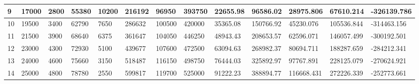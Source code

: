 \begin{table}[]
{\begin{tabular}{|l|l|l|l|l|l|l|l|l|l|l|l|l|}
        9     & 17000     & 2800          & 55380                                                 & 10200                                                          & 216192                                                   & 96950                                                      & 393750                                                          & 22655.98   & 96586.02    & 28975.806     & 67610.214        & -326139.786     \\ \hline
        10    & 19500     & 3400          & 62790                                                 & 7650                                                           & 286632                                                   & 100500                                                     & 420000                                                          & 35365.08   & 150766.92   & 45230.076     & 105536.844       & -314463.156     \\ \hline
        11    & 21500     & 3900          & 68640                                                 & 6375                                                           & 361647                                                   & 104050                                                     & 446250                                                          & 48943.43   & 208653.57   & 62596.071     & 146057.499       & -300192.501     \\ \hline
        12    & 23000     & 4300          & 72930                                                 & 5100                                                           & 439677                                                   & 107600                                                     & 472500                                                          & 63094.63   & 268982.37   & 80694.711     & 188287.659       & -284212.341     \\ \hline
        13    & 24000     & 4600          & 75660                                                 & 3150                                                           & 518487                                                   & 116150                                                     & 498750                                                          & 76444.03   & 325892.97   & 97767.891     & 228125.079       & -270624.921     \\ \hline
        14    & 25000     & 4800          & 78780                                                 & 2550                                                           & 599817                                                   & 119700                                                     & 525000                                                          & 91222.23   & 388894.77   & 116668.431    & 272226.339       & -252773.661     \\ \hline

\end{tabular}}
\end{table}
